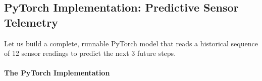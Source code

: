\subsection{PyTorch Implementation: Predictive Sensor Telemetry}\label{subsec:pytorch_sequence}

Let us build a complete, runnable PyTorch model that reads a historical sequence of 12 sensor readings to predict the next 3 future steps.

\paragraph{The PyTorch Implementation}
